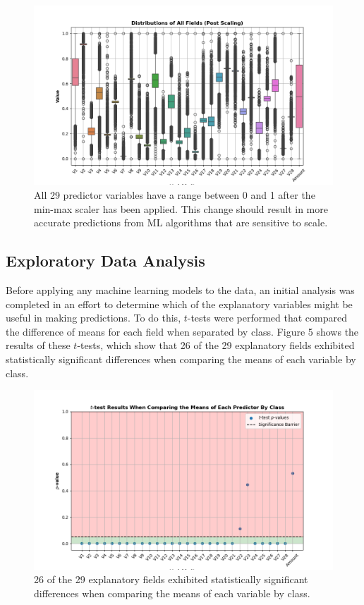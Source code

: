 \documentclass[11pt, oneside]{article}   	%
\begin{document}
\begin{figure}[h!]
    \centering
    \includegraphics[width=1.0\textwidth]{figures/fig_4.png}
    \captionsetup{font=small} 
    \caption{All 29 predictor variables have a range between 0 and 1 after the min-max scaler has been applied. This change should result in more accurate predictions from ML algorithms that are sensitive to scale.}
    \label{fig4}
\end{figure}	

\subsection{Exploratory Data Analysis}

Before applying any machine learning models to the data, an initial analysis was completed in an effort to determine which of the explanatory variables might be useful in making predictions. To do this, $t$-tests were performed that compared the difference of means for each field when separated by class. Figure 5 shows the results of these $t$-tests, which show that 26 of the 29 explanatory fields exhibited statistically significant differences when comparing the means of each variable by class.  

\begin{figure}[h!]
    \centering
    \includegraphics[width=1.0\textwidth]{figures/fig_5.png}
    \captionsetup{font=small} 
    \caption{26 of the 29 explanatory fields exhibited statistically significant differences when comparing the means of each variable by class.}
    \label{fig5}
\end{figure}
\end{document}
